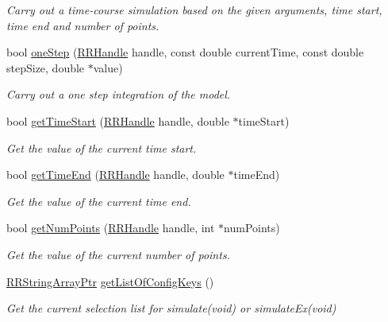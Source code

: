 \begin{DoxyCompactItemize}
\begin{DoxyCompactList}\small\item\em Carry out a time-\/course simulation based on the given arguments, time start, time end and number of points. \end{DoxyCompactList}\item 
bool \hyperlink{group__simulation_ga64cec7cbfbac4e4a11dcda4cc6eb2b9e}{one\+Step} (\hyperlink{rrc__types_8h_a1d68f0592372208fa5a5f2799ea4b3ae}{R\+R\+Handle} handle, const double current\+Time, const double step\+Size, double $\ast$value)
\begin{DoxyCompactList}\small\item\em Carry out a one step integration of the model. \end{DoxyCompactList}\item 
bool \hyperlink{group__simulation_gaf302d02e9f0d57dd05995a7a211e5236}{get\+Time\+Start} (\hyperlink{rrc__types_8h_a1d68f0592372208fa5a5f2799ea4b3ae}{R\+R\+Handle} handle, double $\ast$time\+Start)
\begin{DoxyCompactList}\small\item\em Get the value of the current time start. \end{DoxyCompactList}\item 
bool \hyperlink{group__simulation_ga1130df59dce620b619e3e58874025e57}{get\+Time\+End} (\hyperlink{rrc__types_8h_a1d68f0592372208fa5a5f2799ea4b3ae}{R\+R\+Handle} handle, double $\ast$time\+End)
\begin{DoxyCompactList}\small\item\em Get the value of the current time end. \end{DoxyCompactList}\item 
bool \hyperlink{group__simulation_ga3e14da4bd986a908e4f6bcfc42c20717}{get\+Num\+Points} (\hyperlink{rrc__types_8h_a1d68f0592372208fa5a5f2799ea4b3ae}{R\+R\+Handle} handle, int $\ast$num\+Points)
\begin{DoxyCompactList}\small\item\em Get the value of the current number of points. \end{DoxyCompactList}\item 
\hyperlink{rrc__types_8h_a7c9475df6c7337d99482b13a365e7596}{R\+R\+String\+Array\+Ptr} \hyperlink{group__simulation_ga1a1ed70f4b55da8fd36909dad2ad9477}{get\+List\+Of\+Config\+Keys} ()
\begin{DoxyCompactList}\small\item\em Get the current selection list for simulate(void) or simulate\+Ex(void) \end{DoxyCompactList}\end{DoxyCompactItemize}


